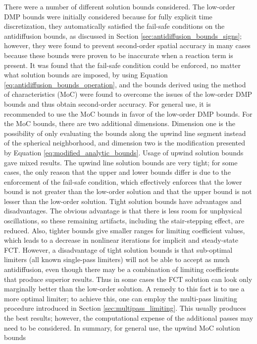 There were a number of different solution bounds considered. The
low-order DMP bounds were initially considered because for fully
explicit time discretization, they automatically satisfied the
fail-safe conditions on the antidiffusion bounds, as discussed in Section
\ref{sec:antidiffusion_bounds_signs}; however, they were found to prevent
second-order spatial accuracy in many cases because these bounds
were proven to be inaccurate when a reaction term is present.
It was found that the fail-safe condition could be enforced, no
matter what solution bounds are imposed, by using Equation
\eqref{eq:antidiffusion_bounds_operation}, and the bounds derived
using the method of characteristics (MoC) were found to overcome
the issues of the low-order DMP bounds and thus obtain second-order
accuracy. For general use, it is recommended to use the MoC bounds
in favor of the low-order DMP bounds. For the MoC bounds, there
are two additional dimensions. Dimension one is the possibility of only
evaluating the bounds along the upwind line segment instead of the spherical
neighborhood, and dimension two is the modification presented by
Equation \eqref{eq:modified_analytic_bounds}. Usage of upwind solution
bounds gave mixed results. The upwind line solution bounds are very
tight; for some cases, the only reason that the upper and lower bounds
differ is due to the enforcement of the fail-safe condition, which
effectively enforces that the lower bound is not greater than the low-order
solution and that the upper bound is not lesser than the low-order
solution. Tight solution bounds have advantages and disadvantages. The
obvious advantage is that there is less room for unphysical oscillations,
so these remaining artifacts, including the stair-stepping effect,
are reduced. Also, tighter bounds give smaller ranges for limiting
coefficient values, which leads to a decrease in nonlinear iterations
for implicit and steady-state FCT. However, a disadvantage of tight
solution bounds is that sub-optimal limiters (all known single-pass limiters)
will not be able to accept as much antidiffusion, even though there
may be a combination of limiting coefficients that produce superior
results. Thus in some cases the FCT solution can look only marginally
better than the low-order solution. A remedy to this fact is to use
a more optimal limiter; to achieve this, one can employ the multi-pass
limiting procedure introduced in Section \ref{sec:multipass_limiting}.
This usually produces the best results; however, the computational
expense of the additional passes may need to be considered.
In summary, for general use, the upwind MoC solution bounds
